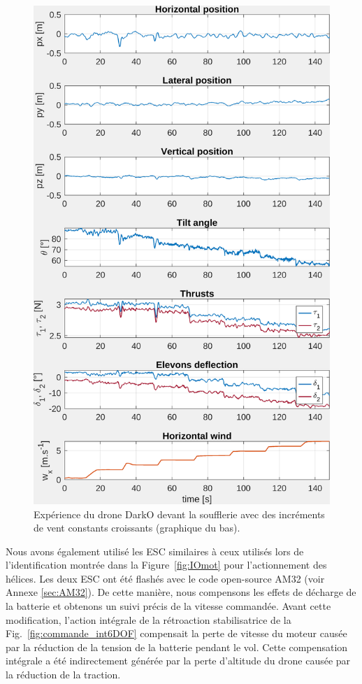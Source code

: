 \begin{figure}[ht!]
    \centering
    \includegraphics[trim=0cm 0cm 0cm 0cm,clip,width=0.6\columnwidth]{figures/exp_systune_struct.png}
    \caption{Expérience du drone DarkO devant la soufflerie avec des incréments de vent constants croissants (graphique du bas).}
    \label{fig:ExpSytuneStruct}
\end{figure}

Nous avons également utilisé les ESC similaires à ceux utilisés lors de l'identification montrée dans la Figure~\ref{fig:IOmot} pour l'actionnement des hélices. Les deux ESC ont été flashés avec le code open-source AM32 (voir Annexe \ref{sec:AM32}). De cette manière, nous compensons les effets de décharge de la batterie et obtenons un suivi précis de la vitesse commandée. Avant cette modification, l'action intégrale de la rétroaction stabilisatrice de la Fig.~\ref{fig:commande_int6DOF} compensait la perte de vitesse du moteur causée par la réduction de la tension de la batterie pendant le vol. Cette compensation intégrale a été indirectement générée par la perte d'altitude du drone causée par la réduction de la traction. 

